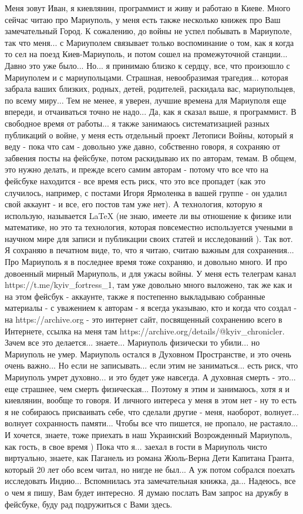Меня зовут Иван, я киевлянин, программист и живу и работаю в Киеве. Много
сейчас читаю про Мариуполь, у меня есть также несколько книжек про Ваш
замечательный Город. К сожалению, до войны не успел побывать в Мариуполе, так
что меня... с Мариуполем связывает только воспоминание о том, как я когда то
сел на поезд Киев-Мариуполь, и потом сошел на промежуточной станции... Давно
это уже было... Но... я принимаю близко к сердцу, все, что произошло с
Мариуполем и с мариупольцами. Страшная, невообразимая трагедия...  которая
забрала ваших близких, родных, детей, родителей, раскидала вас, мариупольцев,
по всему миру... Тем не менее, я уверен, лучшие времена для Мариуполя еще
впереди, и отчаиваться точно не надо... Да, как я сказал выше, я программист. В
свободное время от работы... я также занимаюсь систематизацией разных
публикаций о войне, у меня есть отдельный проект Летописи Войны, который я веду
- пока что сам - довольно уже давно, собственно говоря, я сохраняю от забвения
посты на фейсбуке, потом раскидываю их по авторам, темам. В общем, это нужно
делать, и прежде всего самим авторам - потому что все что на фейсбуке находится
- все время есть риск, что это все пропадет (как это случилось, например, с
постами Игоря Ярмоленка в вашей группе - он удалил свой аккаунт - и все, его
постов там уже нет).  А технология, которую я использую, называется LaTeX (не
знаю, имеете ли вы отношение к физике или математике, но это та технология,
которая повсеместно используется учеными в научном мире для записи и публикации
своих статей и исследований ). Так вот.  Я сохраняю в печатном виде, то, что я
читаю, считаю важным для сохранения...  Про Мариуполь я в последнее время тоже
сохраняю, и довольно много. И про довоенный мирный Мариуполь, и для ужасы
войны. У меня есть телеграм канал https://t.me/kyiv_fortress_1, там уже
довольно много выложено, так же как и на этом фейсбук - аккаунте, также я
постепенно выкладываю собранные  материалы - с уважением к авторам - я всегда
указываю, кто и когда что создал - на https://archive.org - это интернет сайт,
посвященный сохранению всего в Интернете, ссылка на меня там
https://archive.org/details/@kyiv_chronicler.  Зачем все это делается...
знаете... Мариуполь физически то убили... но Мариуполь не умер. Мариуполь
остался в Духовном Пространстве, и это очень очень важно... Но если не
записывать... если этим не заниматься... есть риск, что Мариуполь умрет
духовно... и это будет уже навсегда. А духовная смерть - это...  еще страшнее,
чем смерть физическая... Поэтому я этим и занимаюсь, хотя я и киевлянин, вообще
то говоря. И личного интереса у меня в этом нет - ну то есть я не собираюсь
присваивать себе, что сделали другие - меня, наоборот, волнует... волнует
сохранность памяти... Чтобы все что пишется, не пропало, не растаяло...  И
хочется, знаете, тоже приехать в наш Украинский Возрожденный Мариуполь, как
гость, в свое время ) Пока что я... заехал в гости в Мариуполь чисто
виртуально, знаете, как Паганель из романа Жюль-Верна Дети Капитана Гранта,
который 20 лет обо всем читал, но нигде не был... А уж потом собрался поехать
исследовать Индию... Вспомнилась эта замечательная книжка, да... Надеюсь, все о
чем я пишу, Вам будет интересно. Я думаю послать Вам запрос на дружбу в
фейсбуке, буду рад подружиться с Вами здесь. 

